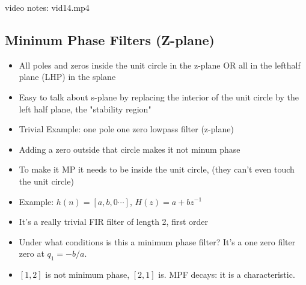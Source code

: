 video notes: vid14.mp4
\subsection*{Mininum Phase Filters (Z-plane)}
\begin{itemize}
\item{All poles and zeros inside the unit circle in the z-plane 
OR all in the lefthalf plane (LHP) in the splane}
\item{Easy to talk about s-plane by replacing the interior of the unit circle by
the left half plane, the "stability region"}

\item{
Trivial Example: one pole one zero lowpass filter (z-plane)
}
\item{
    Adding a zero outside that circle makes it not minum phase
}
\item{
    To make it MP it needs to be inside the unit circle, (they can't even
touch the unit circle)
}


\item{
Example:  $h(n) = [a, b, 0\cdots]$, $H(z) = a + bz^{-1}$

}
\item{
It's a really trivial FIR filter of length 2, first order
}
\item{
Under what conditions is this a minimum phase filter? It's a one
zero filter zero at $q_1 = -b/a$.
}
\item{
$[1, 2]$ is not minimum phase, $[2, 1]$ is. MPF decays: it is a characteristic.
}
\end{itemize}
